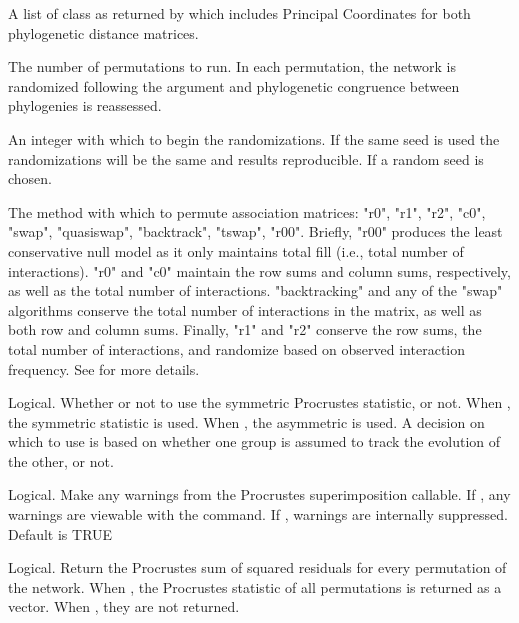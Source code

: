 \documentclass[letterpaper]{book}
\begin{document}
\begin{Arguments}
\begin{ldescription}
\item[\code{D}] A list of class  as returned by  which includes Principal Coordinates for both phylogenetic distance matrices.

\item[\code{nperm}] The number of permutations to run. In each permutation, the network is randomized following the  argument and phylogenetic congruence between phylogenies is reassessed.

\item[\code{seed}] An integer with which to begin the randomizations. If the same seed is used the randomizations will be the same and results reproducible. If  a random seed is chosen.

\item[\code{method}] The method with which to permute association matrices: "r0", "r1", "r2", "c0", "swap", "quasiswap", "backtrack", "tswap", "r00". Briefly, "r00" produces the least conservative null model as it only maintains total fill (i.e., total number of interactions). "r0" and "c0" maintain the row sums and column sums, respectively, as well as the total number of interactions. "backtracking" and any of the "swap" algorithms conserve the total number of interactions in the matrix, as well as both row and column sums. Finally, "r1" and "r2" conserve the row sums, the total number of interactions, and randomize based on observed interaction frequency. See  for more details.

\item[\code{symmetric}] Logical. Whether or not to use the symmetric Procrustes statistic, or not. When , the symmetric statistic is used. When , the asymmetric is used. A decision on which to use is based on whether one group is assumed to track the evolution of the other, or not.

\item[\code{proc.warnings}] Logical. Make any warnings from the Procrustes superimposition callable. If , any warnings are viewable with the  command. If , warnings are internally suppressed. Default is TRUE

\item[\code{shuffled}] Logical. Return the Procrustes sum of squared residuals for every permutation of the network. When , the Procrustes statistic of all permutations is returned as a vector. When , they are not returned.
\end{ldescription}
\end{Arguments}
\end{document}
